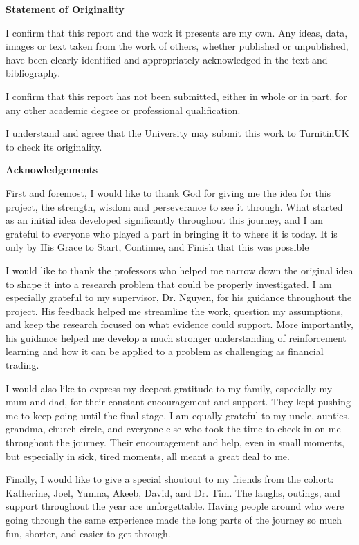 \textbf{\hfill\break
}

\textbf{Statement of Originality}

I confirm that this report and the work it presents are my own. Any
ideas, data, images or text taken from the work of others, whether
published or unpublished, have been clearly identified and appropriately
acknowledged in the text and bibliography.

I confirm that this report has not been submitted, either in whole or in
part, for any other academic degree or professional qualification.

I understand and agree that the University may submit this work to
TurnitinUK to check its originality.

\textbf{Acknowledgements}

First and foremost, I would like to thank God for giving me the idea for
this project, the strength, wisdom and perseverance to see it through.
What started as an initial idea developed significantly throughout this
journey, and I am grateful to everyone who played a part in bringing it
to where it is today. It is only by His Grace to Start, Continue, and
Finish that this was possible

I would like to thank the professors who helped me narrow down the
original idea to shape it into a research problem that could be properly
investigated. I am especially grateful to my supervisor, Dr. Nguyen, for
his guidance throughout the project. His feedback helped me streamline
the work, question my assumptions, and keep the research focused on what
evidence could support. More importantly, his guidance helped me develop
a much stronger understanding of reinforcement learning and how it can
be applied to a problem as challenging as financial trading.

I would also like to express my deepest gratitude to my family,
especially my mum and dad, for their constant encouragement and support.
They kept pushing me to keep going until the final stage. I am equally
grateful to my uncle, aunties, grandma, church circle, and everyone else
who took the time to check in on me throughout the journey. Their
encouragement and help, even in small moments, but especially in sick,
tired moments, all meant a great deal to me.

Finally, I would like to give a special shoutout to my friends from the
cohort: Katherine, Joel, Yumna, Akeeb, David, and Dr. Tim. The laughs,
outings, and support throughout the year are unforgettable. Having
people around who were going through the same experience made the long
parts of the journey so much fun, shorter, and easier to get through.


